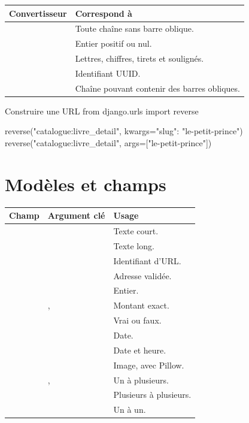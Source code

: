 \begin{longtable}{L{3.8cm} L{11.4cm}}
\toprule
\textbf{Convertisseur} & \textbf{Correspond à} \\
\midrule
\endhead
{} & Toute chaîne sans barre oblique. \\
 & Entier positif ou nul. \\
 & Lettres, chiffres, tirets et soulignés. \\
 & Identifiant UUID. \\
 & Chaîne pouvant contenir des barres obliques. \\
\bottomrule
\end{longtable}

\begin{codebox}[python]{Construire une URL}
from django.urls import reverse

reverse("catalogue:livre_detail", kwargs={"slug": "le-petit-prince"})
reverse("catalogue:livre_detail", args=["le-petit-prince"])
\end{codebox}

\section{Modèles et champs}

\begin{longtable}{L{4.3cm} L{4.5cm} L{6.1cm}}
\toprule
\textbf{Champ} & \textbf{Argument clé} & \textbf{Usage} \\
\midrule
\endhead
{} &  & Texte court. \\
 & & Texte long. \\
 &  & Identifiant d'URL. \\
 & & Adresse validée. \\
 &  & Entier. \\
 & ,  & Montant exact. \\
 &  & Vrai ou faux. \\
 &  & Date. \\
 &  & Date et heure. \\
 &  & Image, avec Pillow. \\
 & ,  & Un à plusieurs. \\
 &  & Plusieurs à plusieurs. \\
 &  & Un à un. \\
\bottomrule
\end{longtable}

